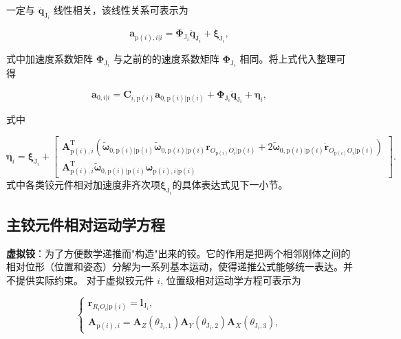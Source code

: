 一定与 $\ddot{\boldsymbol{q}}_{\mathrm{J}_i}$ 线性相关，该线性关系可表示为

\[
\boldsymbol{a}_{\mathrm{p}(i),i|i} = \boldsymbol{\Phi}_{\mathrm{J}_i} \ddot{\boldsymbol{q}}_{\mathrm{J}_i} + \boldsymbol{\xi}_{\mathrm{J}_i},
\]

式中加速度系数矩阵 $\boldsymbol{\Phi}_{\mathrm{J}_i}$ 与之前的的速度系数矩阵 $\boldsymbol{\Phi}_{\mathrm{J}_i}$ 相同。将上式代入整理可得

\[
\boldsymbol{a}_{0,i|i} = \boldsymbol{C}_{i,\mathrm{p}(i)} \boldsymbol{a}_{0,\mathrm{p}(i)|\mathrm{p}(i)} + \boldsymbol{\Phi}_{\mathrm{J}_i} \ddot{\boldsymbol{q}}_{\mathrm{J}_i} + \boldsymbol{\eta}_i,
\]

式中

\[
\boldsymbol{\eta}_i = \boldsymbol{\xi}_{\mathrm{J}_i} + \begin{bmatrix} \boldsymbol{A}_{\mathrm{p}(i),i}^{\mathrm{T}} \left( \tilde{\boldsymbol{\omega}}_{0,\mathrm{p}(i)|\mathrm{p}(i)} \tilde{\boldsymbol{\omega}}_{0,\mathrm{p}(i)|\mathrm{p}(i)} \boldsymbol{r}_{O_{\mathrm{p}(i)} O_i|\mathrm{p}(i)} + 2 \tilde{\boldsymbol{\omega}}_{0,\mathrm{p}(i)|\mathrm{p}(i)} \dot{\boldsymbol{r}}_{O_{\mathrm{p}(i)} O_i|\mathrm{p}(i)} \right) \\ \boldsymbol{A}_{\mathrm{p}(i),i}^{\mathrm{T}} \tilde{\boldsymbol{\omega}}_{0,\mathrm{p}(i)|\mathrm{p}(i)} \boldsymbol{\omega}_{\mathrm{p}(i),i|\mathrm{p}(i)} \end{bmatrix}.
\]
式中各类铰元件相对加速度非齐次项$\boldsymbol{\xi}_{\mathrm{J}_i}$的具体表达式见下一小节。
\subsection{主铰元件相对运动学方程}
\textbf{虚拟铰}：为了方便数学递推而"构造"出来的铰。它的作用是把两个相邻刚体之间的相对位形（位置和姿态）分解为一系列基本运动，使得递推公式能够统一表达。并不提供实际约束。 对于虚拟铰元件 $i$, 位置级相对运动学方程可表示为

\[
\begin{cases}
\boldsymbol{r}_{R_i O_i|\mathrm{p}(i)} = \boldsymbol{l}_{\mathrm{J}_i},\\[6pt]
\boldsymbol{A}_{\mathrm{p}(i),i} = \boldsymbol{A}_Z(\theta_{\mathrm{J}_i,1}) \boldsymbol{A}_Y(\theta_{\mathrm{J}_i,2}) \boldsymbol{A}_X(\theta_{\mathrm{J}_i,3}),
\end{cases}
\]

